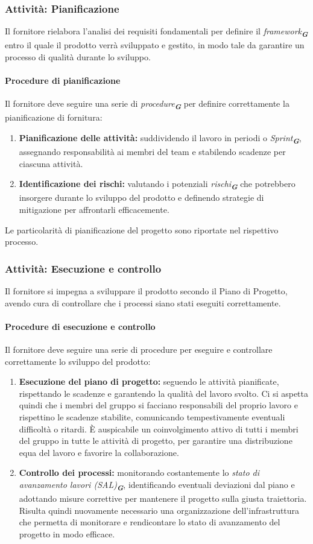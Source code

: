 \documentclass[a4paper,12pt]{article}
\newcommand{\glossario}[1]{\textit{#1}\textsubscript{\textbf{\textit{\textcolor{lightblack}{G}}}}}
\begin{document}
\subsubsection{Attività: Pianificazione}
Il fornitore rielabora l'analisi dei requisiti fondamentali per definire il
\glossario{framework} entro il quale il prodotto verrà sviluppato e gestito, in
modo tale da garantire un processo di qualità durante lo sviluppo. 

\paragraph{Procedure di pianificazione}
Il fornitore deve seguire una serie di \glossario{procedure} per definire correttamente la pianificazione di fornitura:
\begin{enumerate}
    \item \textbf{Pianificazione delle attività:} suddividendo il lavoro in periodi o \glossario{Sprint}, assegnando responsabilità ai membri del team e stabilendo scadenze per ciascuna attività.
    \item \textbf{Identificazione dei rischi:} valutando i potenziali \glossario{rischi} che potrebbero insorgere durante lo sviluppo del prodotto e definendo strategie di mitigazione per affrontarli efficacemente.
\end{enumerate}
Le particolarità di pianificazione del progetto sono riportate nel rispettivo processo. 

\subsubsection{Attività: Esecuzione e controllo}
Il fornitore si impegna a sviluppare il prodotto secondo il Piano di Progetto,
avendo cura di controllare che i processi siano stati eseguiti correttamente.
\paragraph{Procedure di esecuzione e controllo}
Il fornitore deve seguire una serie di procedure per eseguire e controllare correttamente lo sviluppo del prodotto:
\begin{enumerate}
    \item \textbf{Esecuzione del piano di progetto:}  seguendo le attività pianificate, rispettando le scadenze e garantendo la qualità del lavoro svolto. Ci si aspetta quindi che i membri del gruppo si facciano responsabili del proprio lavoro e rispettino le scadenze stabilite, comunicando tempestivamente eventuali difficoltà o ritardi. È auspicabile un coinvolgimento attivo di tutti i membri del gruppo in tutte le attività di progetto, per garantire una distribuzione equa del lavoro e favorire la collaborazione.
    \item \textbf{Controllo dei processi:} monitorando costantemente lo \glossario{stato di avanzamento lavori (SAL)}, identificando eventuali deviazioni dal piano e adottando misure correttive per mantenere il progetto sulla giusta traiettoria. Risulta quindi nuovamente necessario una organizzazione dell'infrastruttura che permetta di monitorare e rendicontare lo stato di avanzamento del progetto in modo efficace.
\end{enumerate}
\end{document}
